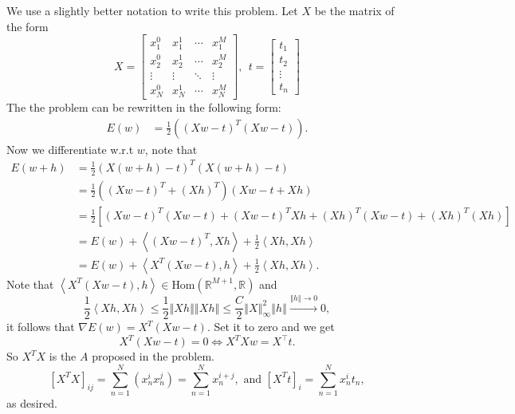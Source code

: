 We use a slightly better notation to write this problem. Let $X$
be the matrix of the form 
\[
X=\begin{bmatrix}x_{1}^{0} & x_{1}^{1} & \cdots & x_{1}^{M}\\
x_{2}^{0} & x_{2}^{1} & \cdots & x_{2}^{M}\\
\vdots & \vdots & \ddots & \vdots\\
x_{N}^{0} & x_{N}^{1} & \cdots & x_{N}^{M}
\end{bmatrix},\ \ t=\begin{bmatrix}t_{1}\\
t_{2}\\
\vdots\\
t_{n}
\end{bmatrix}
\]
The the problem can be rewritten in the following form: 
\begin{align*}
E(w) & =\frac{1}{2}\left(\left(Xw-t\right)^{T}\left(Xw-t\right)\right).
\end{align*}
Now we differentiate w.r.t $w$, note that 
\begin{align*}
E(w+h) & =\frac{1}{2}\left(X\left(w+h\right)-t\right)^{T}\left(X\left(w+h\right)-t\right)\\
 & =\frac{1}{2}\left(\left(Xw-t\right)^{T}+\left(Xh\right)^{T}\right)\left(Xw-t+Xh\right)\\
 & =\frac{1}{2}\left[\left(Xw-t\right)^{T}\left(Xw-t\right)+\left(Xw-t\right)^{T}Xh+\left(Xh\right)^{T}\left(Xw-t\right)+\left(Xh\right)^{T}\left(Xh\right)\right]\\
 & =E\left(w\right)+\left\langle \left(Xw-t\right)^{T},Xh\right\rangle +\frac{1}{2}\left\langle Xh,Xh\right\rangle \\
 & =E\left(w\right)+\left\langle X^{T}\left(Xw-t\right),h\right\rangle +\frac{1}{2}\left\langle Xh,Xh\right\rangle .
\end{align*}
Note that $\left\langle X^{T}\left(Xw-t\right),h\right\rangle \in\text{Hom}(\mathbb{R}^{M+1},\mathbb{R})$
and 
\[
\frac{1}{2}\left\langle Xh,Xh\right\rangle \leq\frac{1}{2}\left\Vert Xh\right\Vert \left\Vert Xh\right\Vert \leq\frac{C}{2}\left\Vert X\right\Vert _{\infty}^{2}\left\Vert h\right\Vert \xrightarrow{\left\Vert h\right\Vert \rightarrow0}0,
\]
it follows that $\nabla E(w)=X^{T}(Xw-t).$ Set it to zero and we
get 
\[
X^{T}(Xw-t)=0\iff X^{T}Xw=X^{\top}t.
\]
So $X^{T}X$ is the $A$ proposed in the problem. 
\[
\left[X^{T}X\right]_{ij}=\sum_{n=1}^{N}\left(x_{n}^{i}x_{n}^{j}\right)=\sum_{n=1}^{N}x_{n}^{i+j},\text{ and }\left[X^{T}t\right]_{i}=\sum_{n=1}^{N}x_{n}^{i}t_{n},
\]
as desired. 
